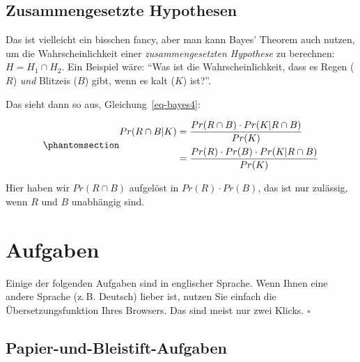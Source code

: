\documentclass[
  ngerman,
  letterpaper,
  twoside,
  open=any]{scrbook}
\theoremstyle{definition}
\theoremstyle{plain}
\theoremstyle{definition}
\theoremstyle{definition}
\theoremstyle{definition}
\theoremstyle{definition}
\theoremstyle{remark}
\begin{document}
\subsection{Zusammengesetzte
Hypothesen}\label{zusammengesetzte-hypothesen}

Das ist vielleicht ein bisschen fancy, aber man kann Bayes' Theorem auch
nutzen, um die Wahrscheinlichkeit einer \emph{zusammengesetzten
Hypothese} zu berechnen: \(H = H_1 \cap H_2\). Ein Beispiel wäre:
\enquote{Was ist die Wahrscheinlichkeit, dass es Regen (\(R\))
\emph{und} Blitzeis (\(B\)) gibt, wenn es kalt (\(K\)) ist?}.

Das sieht dann so aus, Gleichung~\ref{eq-bayes4}:

\begin{equation}\protect\phantomsection\label{eq-bayes4}{
\begin{aligned}
Pr(R \cap B |K) &= \frac{ Pr(R \cap B) \cdot Pr(K|R \cap B) }{Pr(K)} \\
&= \frac{ Pr(R ) \cdot Pr(B) \cdot Pr(K|R \cap B) }{Pr(K)}
\end{aligned}
}\end{equation}

Hier haben wir \(Pr(R \cap B)\) aufgelöst in \(Pr(R) \cdot Pr(B)\), das
ist nur zulässig, wenn \(R\) und \(B\) unabhängig sind.

\section{Aufgaben}\label{aufgaben-5}

\begin{tcolorbox}[enhanced jigsaw, arc=.35mm, bottomrule=.15mm, bottomtitle=1mm, breakable, colback=white, colbacktitle=quarto-callout-tip-color!10!white, colframe=quarto-callout-tip-color-frame, coltitle=black, left=2mm, leftrule=.75mm, opacityback=0, opacitybacktitle=0.6, rightrule=.15mm, title=\textcolor{quarto-callout-tip-color}{\faLightbulb}\hspace{0.5em}{Tipp}, titlerule=0mm, toprule=.15mm, toptitle=1mm]

Einige der folgenden Aufgaben sind in englischer Sprache. Wenn Ihnen
eine andere Sprache (z.\,B. Deutsch) lieber ist, nutzen Sie einfach die
Übersetzungsfunktion Ihres Browsers. Das sind meist nur zwei Klicks.
\(\square\)

\end{tcolorbox}

\subsection{Papier-und-Bleistift-Aufgaben}\label{papier-und-bleistift-aufgaben}
\end{document}
